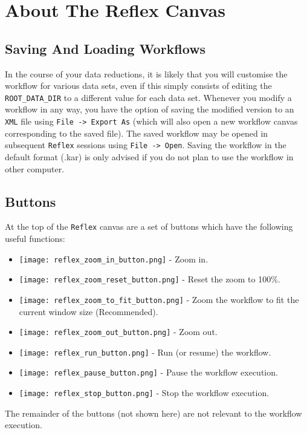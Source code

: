 \section{About The Reflex Canvas \label{sec:about_canvas}}

\subsection{Saving And Loading Workflows}

In the course of your data reductions, it is likely that you will
customise the workflow for various data sets, even if this simply consists of 
editing the {\tt ROOT\_DATA\_DIR} to a different value for each data set. 
Whenever you modify a workflow in any way, you have the option of saving the 
modified version to an {\tt XML} file using {\tt File -> Export As} 
(which will also open a new workflow canvas corresponding to the saved file). 
The saved workflow may be opened in subsequent
{\tt Reflex} sessions using {\tt File -> Open}. Saving the workflow in the
default format (.kar) is only advised if you do not plan to use the workflow
in other computer.

\subsection{Buttons}  
         
At the top of the {\tt Reflex} canvas are a set of buttons which have the following useful functions:
\begin{itemize}
\item{\texttt{[image: reflex\_zoom\_in\_button.png]} - Zoom in.}
\item{\texttt{[image: reflex\_zoom\_reset\_button.png]} - Reset the zoom to 100\%.}
\item{\texttt{[image: reflex\_zoom\_to\_fit\_button.png]} - Zoom the workflow to fit the current window size (Recommended).}
\item{\texttt{[image: reflex\_zoom\_out\_button.png]} - Zoom out.}
\item{\texttt{[image: reflex\_run\_button.png]} - Run (or resume) the workflow.}
\item{\texttt{[image: reflex\_pause\_button.png]} - Pause the workflow execution.}
\item{\texttt{[image: reflex\_stop\_button.png]} - Stop the workflow execution.}
\end{itemize}
The remainder of the buttons (not shown here) are not relevant to the 
workflow execution.

